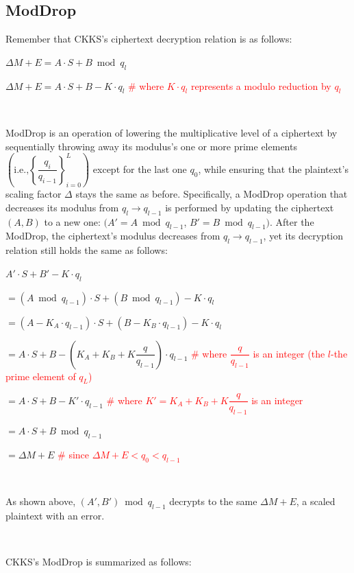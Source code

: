 \subsection{\textsf{ModDrop}}
\label{subsec:ckks-moddrop}

Remember that CKKS's ciphertext decryption relation is as follows:

$\Delta M + E = A \cdot S + B \bmod q_l$

$\Delta M + E = A \cdot S + B - K\cdot q_l$ \textcolor{red}{ \# where $K\cdot q_l$ represents a modulo reduction by $q_l$}

$ $

\textsf{ModDrop} is an operation of lowering the multiplicative level of a ciphertext by sequentially throwing away its modulus's one or more prime elements $\left(\text{i.e.,} \left\{\dfrac{q_i}{q_{i-1}}\right\}_{i=0}^{L}\right)$ except for the last one $q_0$, while ensuring that the plaintext's scaling factor $\Delta$ stays the same as before. Specifically, a \textsf{ModDrop} operation that decreases its modulus from $q_l \rightarrow q_{l-1}$ is performed by updating the ciphertext $(A, B)$ to a new one: $\bm(A' = A \bmod q_{l-1}$, $B' = B \bmod q_{l-1})$. After the \textsf{ModDrop}, the ciphertext's modulus decreases from $q_l \rightarrow q_{l-1}$, yet its decryption relation still holds the same as follows:

$A' \cdot S + B' - K\cdot q_l $

$= (A \bmod q_{l-1}) \cdot S + (B \bmod q_{l-1}) - K\cdot q_l$

$= (A - K_A\cdot q_{l-1}) \cdot S + (B - K_B\cdot q_{l-1}) - K\cdot q_l$ 

$= A\cdot S + B - (K_A + K_B + K\dfrac{q}{q_{l-1}})\cdot q_{l-1}$
\textcolor{red}{ \# where $\dfrac{q}{q_{l-1}}$ is an integer (the $l$-the prime element of $q_L$)}

$= A\cdot S + B - K'\cdot q_{l-1}$ \textcolor{red}{ \# where $K' = K_A + K_B + K\dfrac{q}{q_{l-1}}$ is an integer}

$= A\cdot S + B \bmod q_{l-1}$

$= \Delta M + E$ \textcolor{red}{\# since $\Delta M + E < q_0 < q_{l-1}$}

$ $

As shown above, $(A', B') \bmod q_{l-1}$ decrypts to the same $\Delta M + E$, a scaled plaintext with an error. 

$ $



CKKS's \textsf{ModDrop} is summarized as follows:



